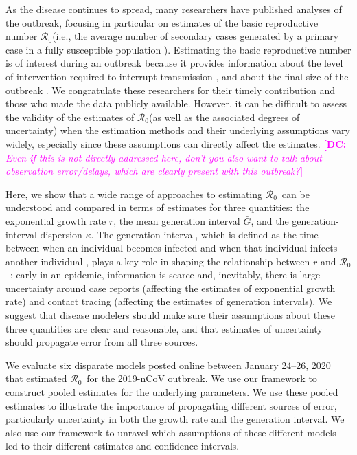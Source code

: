 \documentclass[12pt]{article}
\newcommand{\Rx}[1]{\ensuremath{{\mathcal R}_{#1}}}
\newcommand{\Ro}{\Rx{0}\xspace}
\newcommand{\comment}[3]{\textcolor{#1}{\textbf{[#2: }\textsl{#3}\textbf{]}}}
\newcommand{\dc}[1]{\comment{magenta}{DC}{#1}}
\begin{document}
As the disease continues to spread, many researchers have published analyses of the outbreak, focusing in particular on estimates of the basic reproductive number \Ro (i.e., the average number of secondary cases generated by a primary case in a fully susceptible population \citep{anderson1991infectious, diekmann1990definition}).
Estimating the basic reproductive number is of interest during an outbreak because it provides information about the level of intervention required to interrupt transmission \citep{anderson1991infectious}, and about the final size of the outbreak \citep{anderson1991infectious, ma2006generality}.
We congratulate these researchers for their timely contribution and those who made the data publicly available.
However, it can be difficult to assess the validity of the estimates of \Ro (as well as the associated degrees of uncertainty) when the estimation methods and their underlying assumptions vary widely, especially since these assumptions can directly affect the estimates.
\dc{Even if this is not directly addressed here, don’t you also want to talk about observation error/delays, which are clearly present with this outbreak?}

Here, we show that a wide range of approaches to estimating \Ro\ can be understood and compared in terms of estimates for three quantities: the exponential growth rate $r$, the mean generation interval $\bar G$, and the generation-interval dispersion $\kappa$.
The generation interval, which is defined as the time between when an individual becomes infected and when that individual infects another individual \citep{svensson2007note}, plays a key role in shaping the relationship between $r$ and \Ro\ \citep{wearing2005appropriate, roberts2007model, wallinga2007generation, park2019practical};
early in an epidemic, information is scarce and, inevitably, there is large uncertainty around case reports (affecting the estimates of exponential growth rate) and contact tracing (affecting the estimates of generation intervals).
We suggest that disease modelers should make sure their assumptions about these three quantities are clear and reasonable, and that estimates of uncertainty should propagate error from all three sources.

We evaluate six disparate models posted online between January 24--26, 2020 that estimated \Ro\ for the 2019-nCoV outbreak. We use our framework to construct pooled estimates for the underlying parameters. We use these pooled estimates to illustrate the importance of propagating different sources of error, particularly uncertainty in both the growth rate and the generation interval. We also use our framework to unravel which assumptions of these different models led to their different estimates and confidence intervals.
\end{document}
